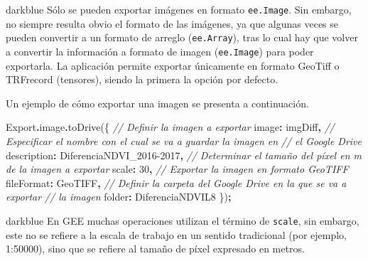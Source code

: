 \documentclass[
  12pt,
  letterpaper,
  twoside]{book}
\newenvironment{Shaded}{\begin{snugshade}}{\end{snugshade}}
\newcommand{\AttributeTok}[1]{\textcolor[rgb]{0.77,0.63,0.00}{#1}}
\newcommand{\CommentTok}[1]{\textcolor[rgb]{0.56,0.35,0.01}{\textit{#1}}}
\newcommand{\DataTypeTok}[1]{\textcolor[rgb]{0.13,0.29,0.53}{#1}}
\newcommand{\DecValTok}[1]{\textcolor[rgb]{0.00,0.00,0.81}{#1}}
\newcommand{\FunctionTok}[1]{\textcolor[rgb]{0.00,0.00,0.00}{#1}}
\newcommand{\NormalTok}[1]{#1}
\newcommand{\OperatorTok}[1]{\textcolor[rgb]{0.81,0.36,0.00}{\textbf{#1}}}
\newcommand{\StringTok}[1]{\textcolor[rgb]{0.31,0.60,0.02}{#1}}
\begin{document}
\begin{bluebox2}

\begin{awesomeblock}{5pt}{\faLightbulb}{darkblue}
Sólo se pueden exportar imágenes en formato \texttt{ee.Image}. Sin embargo, no siempre resulta obvio el formato de las imágenes, ya que algunas veces se pueden convertir a un formato de arreglo (\texttt{ee.Array}), tras lo cual hay que volver a convertir la información a formato de imagen (\texttt{ee.Image}) para poder exportarla. La aplicación permite exportar únicamente en formato GeoTiff o TRFrecord (tensores), siendo la primera la opción por defecto.

\end{awesomeblock}

\end{bluebox2}

Un ejemplo de cómo exportar una imagen se presenta a continuación.

\begin{Shaded}
\begin{Highlighting}[]
\NormalTok{Export}\OperatorTok{.}\AttributeTok{image}\OperatorTok{.}\FunctionTok{toDrive}\NormalTok{(\{}
  \CommentTok{// Definir la imagen a exportar}
  \DataTypeTok{image}\OperatorTok{:}\NormalTok{ imgDiff}\OperatorTok{,}
  \CommentTok{// Especificar el nombre con el cual se va a guardar la imagen en}
  \CommentTok{// el Google Drive}
  \DataTypeTok{description}\OperatorTok{:} \StringTok{\textquotesingle{}DiferenciaNDVI\_2016{-}2017\textquotesingle{}}\OperatorTok{,}
  \CommentTok{// Determinar el tamaño del píxel en m de la imagen a exportar}
  \DataTypeTok{scale}\OperatorTok{:} \DecValTok{30}\OperatorTok{,}
  \CommentTok{// Exportar la imagen en formato GeoTIFF}
  \DataTypeTok{fileFormat}\OperatorTok{:} \StringTok{\textquotesingle{}GeoTIFF\textquotesingle{}}\OperatorTok{,}
  \CommentTok{// Definir la carpeta del Google Drive en la que se va a exportar}
  \CommentTok{// la imagen}
  \DataTypeTok{folder}\OperatorTok{:} \StringTok{\textquotesingle{}DiferenciaNDVIL8\textquotesingle{}}
\NormalTok{\})}\OperatorTok{;} 
\end{Highlighting}
\end{Shaded}

\begin{bluebox2}

\begin{awesomeblock}{5pt}{\faLightbulb}{darkblue}
En GEE muchas operaciones utilizan el término de \texttt{scale}, sin embargo, este no se refiere a la escala de trabajo en un sentido tradicional (por ejemplo, 1:50000), sino que se refiere al tamaño de píxel expresado en metros.

\end{awesomeblock}

\end{bluebox2}
\end{document}
